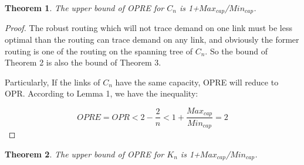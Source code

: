 \documentclass[conference]{IEEEtran}
\newtheorem{theorem}{Theorem}
\begin{document}
\begin{theorem}
The upper bound of OPRE for $C_n$ is 1+${Max_{cap}}$/${Min_{cap}}$.
\end{theorem}

\begin{proof}
The robust routing which will not trace demand on one link must be less optimal than the routing can trace demand on any link,
and obviously the former routing is one of the routing on the spanning tree of $C_n$. So the bound of Theorem 2 is also the 
bound of Theorem 3.

Particularly, If the links of $C_n$ have the same capacity, OPRE will reduce to OPR. According to Lemma 1, we have the inequality:

\begin{equation}
OPRE = OPR < 2 - \frac{2}{n} < 1 + \frac{Max_{cap}}{Min_{cap}} = 2
\end{equation}

\end{proof}


\begin{theorem}
The upper bound of OPRE for $K_n$ is 1+${Max_{cap}}$/${Min_{cap}}$.
\end{theorem}
\end{document}
